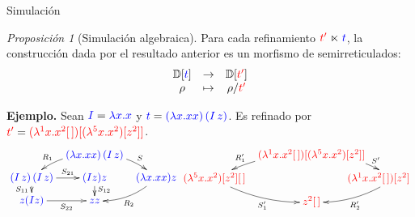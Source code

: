 \documentclass{beamer}
\theoremstyle{remark}
\newtheorem{proes}{Proposición}
\newcommand{\cLam}[1]{{\color{darkBlue} #1}}
\newcommand{\cDist}[1]{{\color{red} #1}}
\begin{document}
\begin{frame}{Simulación}
\begin{proes}[Simulación algebraica]
Para cada refinamiento $\cDist{t'} \refines \cLam{t}$, la construcción dada por el resultado
anterior es un morfismo de semirreticulados:
\[
\begin{array}{ccc}
  \ulbDeriv{\cLam{t}} & \to & \ulbDeriv{\cDist{t'}} \\
  \rho & \mapsto & \rho / \cDist{t'} \\
\end{array}
\]
\end{proes}

\textbf{Ejemplo.}
Sean $\cLam{I} = \cLam{\lam{x}{x}}$ y
$\cLam{t} = \cLam{(\lam{\var}{\var\var})\,(I\, \varthree)}$.
Es refinado por $\cDist{t'} = \cDist{(\lamp{1}{x}{x^2 [\,]}) [(\lamp{5}{x}{x^2}) [z^2]]}$.
{\scriptsize
\[
  \xymatrix@=.2cm{
  &
    \cLam{(\lam{\var}{\var\var})\,(I\, \varthree)}
    \ar@/_.25cm/[dl]_-{\redex_1}
    \ar@/^.25cm/[dr]^-{\redextwo}
  &
  &
  \\
    \cLam{(I\, \varthree)\, (I\, \varthree)}
    \ar[d]_-{\redextwo_{11}}
    \ar[r]^-{\redextwo_{21}}
  &
    \cLam{(I\varthree)\varthree}
    \ar[d]^{\redextwo_{12}}
  &
    \cLam{(\lam{\var}{\var\var})\varthree}
    \ar@/^.25cm/[dl]^-{\redex_2}
  \\
    \cLam{\varthree (I\varthree)}
    \ar[r]_-{\redextwo_{22}}
  &
    \cLam{ \varthree \varthree}
  }\hspace{-0.4cm}\xymatrix@=.2cm{
  &
    \cDist{(\lamp{1}{x}{x^2 [\,]}) [(\lamp{5}{x}{x^2}) [z^2]]}
    \ar@/_.25cm/[dl]_-{\redex'_1}
    \ar@/^.25cm/[dr]^-{\redextwo'}
  \\
    \cDist{(\lamp{5}{x}{x^2}) [z^2] [\,]}
    \ar@/_.25cm/[dr]_-{\redextwo'_1}
  &
  &
    \cDist{\hspace{-1cm}(\lamp{1}{x}{x^2 [\,]}) [z^2]}
    \ar@/^.25cm/[dl]^-{\redex'_2}
  \\
  &
    \cDist{z^2 [\,]}
  }
\]
}
\end{frame}
\end{document}

